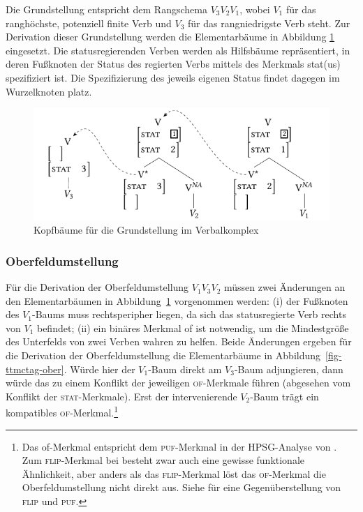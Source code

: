 Die Grundstellung entspricht dem Rangschema $V_3 V_2 V_1$, wobei $V_1$ für das ranghöchste, potenziell finite Verb und $V_3$ für das rangniedrigste Verb steht. Zur Derivation dieser Grundstellung werden die Elementarbäume in Abbildung \ref{fig-ttmctag-grund} eingesetzt. Die statusregierenden Verben werden als Hilfsbäume repräsentiert, in deren Fu\ss knoten der Status des regierten Verbs mittels des Merkmals {\sc stat(us)} spezifiziert ist. Die Spezifizierung des jeweils eigenen Status findet dagegen im Wurzelknoten platz. %
\begin{figure}[t]
\centering
\includegraphics{graphics/abb710.pdf}
\caption{\label{fig-ttmctag-grund}Kopfbäume für die Grundstellung im Verbalkomplex}
\end{figure}


\subsubsection*{Oberfeldumstellung}

Für die Derivation der Oberfeldumstellung $V_1 V_3 V_2$  müssen zwei Änderungen an den Elementarbäumen in Abbildung~\ref{fig-ttmctag-grund} vorgenommen werden: (i) der Fu\ss knoten des $V_1$-Baums muss rechtsperipher liegen, da sich das statusregierte Verb rechts von $V_1$ befindet; (ii) ein binäres Merkmal {\sc of} ist notwendig, um die Mindestgrö\ss e des Unterfelds von zwei Verben wahren zu helfen. Beide Änderungen ergeben für die Derivation der Oberfeldumstellung die Elementarbäume in Abbildung~\ref{fig-ttmctag-ober}. Würde hier der $V_1$-Baum direkt am $V_3$-Baum adjungieren, dann würde das zu einem Konflikt der jeweiligen \textsc{of}-Merkmale führen (abgesehen vom Konflikt der \textsc{stat}-Merkmale). Erst der intervenierende $V_2$-Baum trägt ein kompatibles \textsc{of}-Merkmal.\footnote{Das {\sc of}-Merkmal entspricht dem \textsc{puf}-Merkmal in der HPSG-Analyse von \citet[201]{Meurers:99}. Zum \textsc{flip}-Merkmal bei \cite{Hinrichs:Nakazawa:94} besteht zwar auch eine gewisse funktionale Ähnlichkeit, aber anders als das \textsc{flip}-Merkmal löst das \textsc{of}-Merkmal die Oberfeldumstellung nicht direkt aus. Siehe \citet[201]{Meurers:99} für eine Gegenüberstellung von \textsc{flip} und \textsc{puf}.}   

